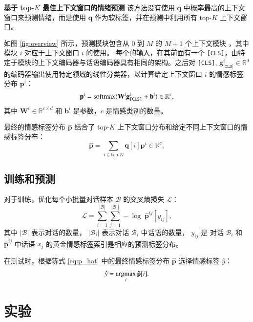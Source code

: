 \noindent\textbf{基于 top-$K$ 最佳上下文窗口的情绪预测 }
该方法没有使用 $\mathbf{q}$ 中概率最高的上下文窗口来预测情绪，而是使用 $\mathbf{q}$ 作为软标签，并在预测中利用所有 top-$K$ 上下文窗口。

如图 \ref{fig:overview} 所示，预测模块包含从 $0$ 到 $M$ 的 $M+1$ 个上下文模块 ，其中模块 $i$ 对应于上下文窗口 $i$ 的使用。
每个的输入，在其前面有一个 \texttt{[CLS]}，由特定于模块的上下文编码器与话语编码器具有相同的架构。之后对 \texttt{[CLS]}, $\mathbf{g}^i_{\texttt{[CLS]}} \in \mathbb{R}^d$ 的编码器输出使用特定领域的线性分类器，以计算给定上下文窗口 $i$ 的情感标签分布 $\mathbf{p}^i$：
\begin{equation}
    \mathbf{p}^i = \operatorname*{softmax}(\mathbf{W}^i\mathbf{g}^i_{\texttt{[CLS]}} + \mathbf{b}^i) \in \mathbb{R}^{c}, \nonumber
\end{equation}
其中 $\mathbf{W}^i \in \mathbb{R}^{c \times d}$ 和 $\mathbf{b}^i$ 是参数，$c$ 是情感类别的数量。

最终的情感标签分布 $\mathbf{\hat{p}}$ 结合了 top-$K$ 上下文窗口分布和给定不同上下文窗口的情感标签分布：
\begin{equation}\label{eq:p_hat}
    \mathbf{\hat{p}} = \sum_{i \in \textrm{top-}K}\mathbf{q}[i] \mathbf{p}^i \in \mathbb{R}^{c},
\end{equation}

\subsection{训练和预测}
对于训练，优化每个小批量对话样本 $\mathcal{B}$ 的交叉熵损失 $\mathcal{L}$：
\begin{equation}
    \mathcal{L} = \sum_{i=1}^{|\mathcal{B}|}\sum_{j=1}^{|\mathcal{B}_i|}-\log\;\mathbf{\hat{p}}^{ij}[y_{ij}], \nonumber
\end{equation}
其中 $|\mathcal{B}|$ 表示对话的数量， $|\mathcal{B}_i|$ 表示对话 $\mathcal{B}_i$ 中话语的数量， $y_{ij}$ 是 对话 $\mathcal{B}_i$ 和 $\mathbf{\hat{p}}^{ij}$ 中话语 $x_j$ 的黄金情感标签索引是相应的预测标签分布。

在测试时，根据等式 \ref{eq:p_hat} 中的最终情感标签分布 $\mathbf{\hat{p}}$ 选择情感标签 $\hat{y}$：
\begin{equation}
    \hat{y} = \operatorname*{argmax}_i \mathbf{\hat{p}}[i]. \nonumber
\end{equation}

\section{实验}\label{sec:erc_exp}
